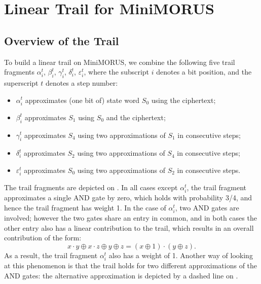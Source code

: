 \documentclass{llncs}
\newcommand{\cipher}[1]{\textsf{#1}}
\begin{document}
\section{Linear Trail for \cipher{MiniMORUS}}

\subsection{Overview of the Trail}

To build a linear trail on \cipher{MiniMORUS}, we combine the following five trail fragments $\alpha^t_i$, $\beta^t_i$, $\gamma^t_i$, $\delta^t_i$, $\varepsilon^t_i$, where the subscript $i$ denotes a bit position, and the superscript $t$ denotes a step number:
\begin{itemize}
    \item $\alpha^t_i$ approximates (one bit of) state word $S_0$ using the ciphertext;
    \item $\beta^t_i$ approximates $S_1$ using $S_0$ and the ciphertext;
    \item $\gamma^t_i$ approximates $S_4$ using two approximations of $S_1$ in consecutive steps;
    \item $\delta^t_i$ approximates $S_2$ using two approximations of $S_4$ in consecutive steps;
    \item $\varepsilon^t_i$ approximates $S_0$ using two approximations of $S_2$ in consecutive steps.
\end{itemize}

The trail fragments are depicted on . In all cases except $\alpha^t_i$, the trail fragment approximates a single AND gate by zero, which holds with probability 3/4, and hence the trail fragment has weight 1. In the case of $\alpha^t_i$, two AND gates are involved; however the two gates share an entry in common, and in both cases the other entry also has a linear contribution to the trail, which results in an overall contribution of the form:
\[
x \cdot y \oplus x \cdot z \oplus y \oplus z= (x \oplus 1) \cdot (y \oplus z).
\]
As a result, the trail fragment $\alpha^t_i$ also has a weight of 1. Another way of looking at this phenomenon is that the trail holds for two different approximations of the AND gates: the alternative approximation is depicted by a dashed line on .
\end{document}
